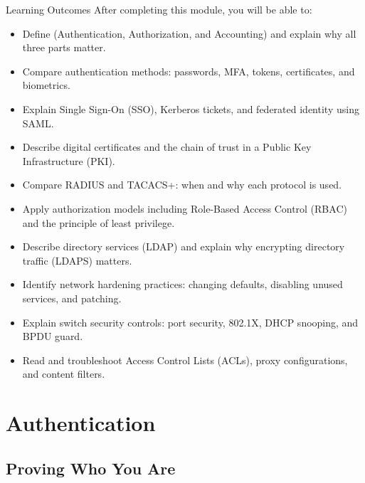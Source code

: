 \documentclass[aspectratio=169]{beamer}  %
\begin{document}
\begin{frame}[t,allowframebreaks]{Learning Outcomes}
    After completing this module, you will be able to:
    \vspace{0.5em}
    \small
    \begin{itemize}
        \item Define  (Authentication, Authorization, and Accounting) and explain why all three parts matter.
        \item Compare authentication methods: passwords, MFA, tokens, certificates, and biometrics.
        \item Explain Single Sign-On (SSO), Kerberos tickets, and federated identity using SAML.
        \item Describe digital certificates and the chain of trust in a Public Key Infrastructure (PKI).
        \item Compare RADIUS and TACACS+: when and why each protocol is used.
        \item Apply authorization models including Role-Based Access Control (RBAC) and the principle of least privilege.
        \item Describe directory services (LDAP) and explain why encrypting directory traffic (LDAPS) matters.
        \item Identify network hardening practices: changing defaults, disabling unused services, and patching.
        \item Explain switch security controls: port security, 802.1X, DHCP snooping, and BPDU guard.
        \item Read and troubleshoot Access Control Lists (ACLs), proxy configurations, and content filters.
    \end{itemize}
\end{frame}

\section{Authentication}
\subsection{Proving Who You Are}

\end{document}

